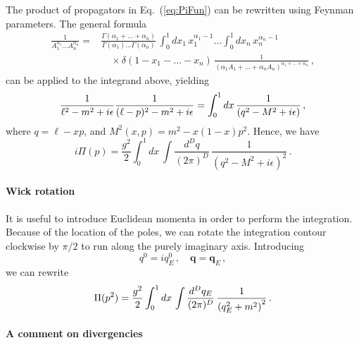 The product of propagators in Eq.~(\ref{eq:PiFun}) can be rewritten
using Feynman parameters. The general formula
\begin{align}
  \frac{1}{A_1^{\alpha_1} \ldots A_n^{\alpha_n}}
  = & \frac{\Gamma(\alpha_1+\ldots +\alpha_n)}{\Gamma(\alpha_1)\ldots
      \Gamma(\alpha_n)}\, \int_0^1 dx_1\, x_1^{\alpha_1 -1} \ldots
      \int_0^1 dx_n\, x_n^{\alpha_n -1} \nonumber \\
    & \quad \times \delta\left(1-x_1-\ldots -x_n\right)\,
      \frac{1}{\left(\alpha_1 A_1 + \ldots + \alpha_n
      A_n\right)^{\alpha_1 + \ldots + \alpha_n}}\, , 
\end{align}
can be applied to the integrand above, yielding
\begin{align}
  \frac{1}{\ell^2-m^2+i\epsilon} \frac{1}{(\ell-p)^2-m^2+i\epsilon} = \int_0^1dx\,
  \frac{1}{\left(q^2-M^2 +i\epsilon\right)}\, ,
\end{align}
where $q=\ell-xp$, and $M^2(x,p)=m^2-x(1-x)p^2$. Hence, we have
\begin{equation}
  \label{eq:PiAfterFeynPar}
  i\Pi(p) = \frac{g^2}{2} \int_0^1dx\, \int \frac{d^Dq}{(2\pi)^D}\, 
  \frac{1}{\left(q^2-M^2 +i\epsilon\right)^2}\, .
\end{equation}

\paragraph{Wick rotation}

It is useful to introduce Euclidean momenta in order to perform the
integration. Because of the location of the poles, we can rotate the
integration contour clockwise by $\pi/2$ to run along the purely
imaginary axis. Introducing
\begin{equation}
  \label{eq:EuclideanMom}
  q^0 = i q^0_E\, , \quad \mathbf{q} = \mathbf{q}_E\, ,
\end{equation}
we can rewrite
\begin{equation}
  \label{eq:PiEuclMom}
  \Pi(p^2) = \frac{g^2}{2} \int_0^1dx\, \int \frac{d^Dq_E}{(2\pi)^D}\, 
  \frac{1}{\left(q_E^2+m^2\right)^2}\, .
\end{equation}

\paragraph{A comment on divergencies}

